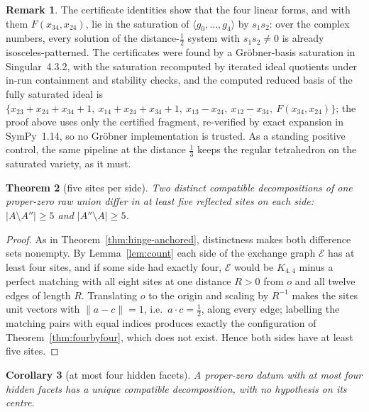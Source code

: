\documentclass[11pt]{amsart}
\newtheorem{theorem}{Theorem}[section]
\newtheorem{corollary}[theorem]{Corollary}
\theoremstyle{definition}
\newtheorem{remark}[theorem]{Remark}
\begin{document}
\begin{remark}
The certificate identities show that the four linear forms, and with them
$F(x_{34},x_{24})$, lie in the saturation of
$\langle g_0,\ldots,g_4\rangle$ by $s_1s_2$: over the complex numbers, every
solution of the distance-$\tfrac12$ system with $s_1s_2\neq0$ is already
isosceles-patterned.  The certificates were found by a Gr\"obner-basis
saturation in Singular~4.3.2, with the saturation recomputed by iterated
ideal quotients under in-run containment and stability checks, and the
computed reduced basis of the fully saturated ideal is
$\{x_{23}+x_{24}+x_{34}+1,\ x_{14}+x_{24}+x_{34}+1,\ x_{13}-x_{24},\
x_{12}-x_{34},\ F(x_{34},x_{24})\}$; the proof above uses only the certified
fragment, re-verified by exact expansion in SymPy~1.14, so no Gr\"obner
implementation is trusted.  As a standing positive control, the same pipeline
at the distance $\tfrac13$ keeps the regular tetrahedron on the saturated
variety, as it must.
\end{remark}

\begin{theorem}[five sites per side]
\label{thm:five}
Two distinct compatible decompositions of one proper-zero raw union differ in
at least five reflected sites on each side:
$|A\setminus A''|\ge5$ and $|A''\setminus A|\ge5$.
\end{theorem}

\begin{proof}
As in Theorem~\ref{thm:hinge-anchored}, distinctness makes both difference
sets nonempty.  By Lemma~\ref{lem:count} each side of the exchange graph
$\mathcal E$ has at least four sites, and if some side had exactly four,
$\mathcal E$ would be
$K_{4,4}$ minus a perfect matching with all eight sites at one distance
$R>0$ from $o$ and all twelve edges of length $R$.  Translating $o$ to the
origin and scaling by $R^{-1}$ makes the sites unit vectors with
$\|a-c\|=1$, i.e.\ $a\cdot c=\tfrac12$, along every edge; labelling the
matching pairs with equal indices produces exactly the configuration of
Theorem~\ref{thm:fourbyfour}, which does not exist.  Hence both sides have at
least five sites.
\end{proof}

\begin{corollary}[at most four hidden facets]
\label{cor:four}
A proper-zero datum with at most four hidden facets has a unique compatible
decomposition, with no hypothesis on its centre.
\end{corollary}
\end{document}
